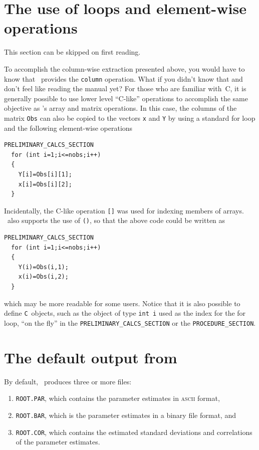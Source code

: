 \documentclass{admbmanual}
\begin{document}
\section{The use of loops and element-wise operations}

This section can be skipped on first reading.

To accomplish the column-wise extraction presented above, you would have to know
that \scAD\ provides the \texttt{column} operation. What if you didn't know that
and don't feel like reading the manual yet? For those who are familiar with~C,
it is generally possible to use lower level ``C-like'' operations to accomplish
the same objective as \scAD's array and matrix operations. In this case, the
columns of the matrix \texttt{Obs} can also be copied to the vectors \texttt{x}
and \texttt{Y} by using a standard for loop and the following element-wise
operations
\begin{lstlisting}
PRELIMINARY_CALCS_SECTION
  for (int i=1;i<=nobs;i++)
  {
    Y[i]=Obs[i][1];
    x[i]=Obs[i][2];
  }
\end{lstlisting}
Incidentally, the C-like operation \texttt{[]} was used for indexing members of
arrays. \ADM\ also supports the use of \texttt{()}, so that the above code could
be written as
\begin{lstlisting}
PRELIMINARY_CALCS_SECTION
  for (int i=1;i<=nobs;i++)
  {
    Y(i)=Obs(i,1);
    x(i)=Obs(i,2);
  }
\end{lstlisting}
which may be more readable for some users. Notice that it is also possible to
define \texttt{C}~objects, such as the object of type \texttt{int i} used as the
index for the for loop, ``on the fly'' in the
\texttt{PRELIMINARY\_CALCS\_SECTION} or the \texttt{PROCEDURE\_SECTION}.

\section{The default output from \ADM}

By default, \ADM\ produces three or more files:
\begin{enumerate}
  \item \texttt{ROOT.PAR}, which contains the parameter estimates in
  \textsc{ascii} format,

  \item \texttt{ROOT.BAR}, which is the parameter estimates in a binary file
  format, and

  \item \texttt{ROOT.COR}, which contains the estimated standard deviations and
  correlations of the parameter estimates.
\end{enumerate}
\end{document}
